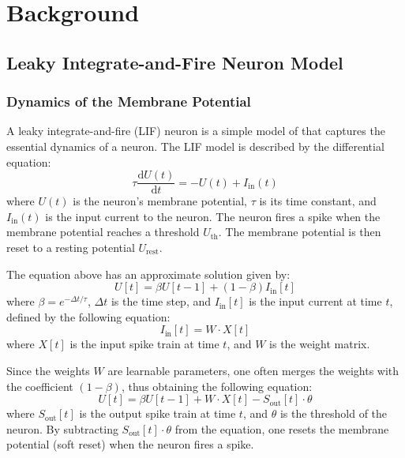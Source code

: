 \chapter{Background}
\label{chap:background}

\section{Leaky Integrate-and-Fire Neuron Model}
\label{sec:lif}

    \subsection{Dynamics of the Membrane Potential}
    \label{subsec:lif_dynamics}
        A leaky integrate-and-fire (LIF) neuron \cite{lapicque1907louis} is a simple model of that captures the essential dynamics of a neuron. The LIF model is described by the differential equation:
        \begin{equation}
            \tau \frac{\mathrm{d}U(t)}{\mathrm{d}t} = -U(t) + I_{\text{in}}(t)
        \end{equation}
        where $U(t)$ is the neuron's membrane potential, $\tau$ is its time constant, and $I_{\text{in}}(t)$ is the input current to the neuron. The neuron fires a spike when the membrane potential reaches a threshold $U_{\text{th}}$. The membrane potential is then reset to a resting potential $U_{\text{rest}}$. 

        The equation above has an approximate solution given by:
        \begin{equation}
            U[t] = \beta U[t-1] + (1 - \beta) I_{\text{in}}[t]
        \end{equation}
        where $\beta = e^{-\Delta t/\tau}$, $\Delta t$ is the time step, and $I_{\text{in}}[t]$ is the input current at time $t$, defined by the following equation:
        \begin{equation}
            I_{\text{in}}[t] = W\cdot X[t]
        \end{equation}
        where $X[t]$ is the input spike train at time $t$, and $W$ is the weight matrix. 

        Since the weights $W$ are learnable parameters, one often merges the weights with the coefficient $(1 - \beta)$, thus obtaining the following equation:
        \begin{equation}
            U[t] = \beta U[t-1] + W\cdot X[t] - S_{\text{out}}[t]\cdot\theta
        \end{equation}
        where $S_{\text{out}}[t]$ is the output spike train at time $t$, and $\theta$ is the threshold of the neuron. 
        By subtracting $S_{\text{out}}[t]\cdot\theta$ from the equation, one resets the membrane potential (soft reset) when the neuron fires a spike.

